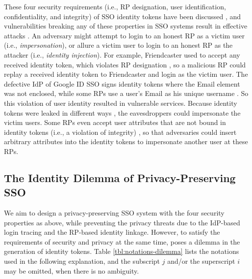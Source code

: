 These four security requirements (i.e., RP designation, user identification, confidentiality, and integrity) of SSO identity tokens
     have been discussed \cite{ArmandoCCCT08,FettKS16, FettKS17},
     and
     vulnerabilities breaking any of these properties in SSO systems
            result in effective attacks \cite{SomorovskyMSKJ12, WangCW12, ArmandoCCCPS13, ZhouE14, WangZLLYLG15, WangZLG16, YangLLZH16, MainkaMS16, MainkaMSW17, YangLCZ18, YangLS17, ShiWL19, ChenPCTKT14, ccsSunB12, DiscoveringJCS, dimvaLiM16, CaoSBKVC14, TowardsShehabM14}.
An adversary might attempt to login to an honest RP as a victim user (i.e., \emph{impersonation}),
 or allure a victim user to login to an honest RP as the attacker (i.e.,  \emph{identity injection}).
For example, Friendcaster used to accept any received identity token, which violates RP designation \cite{ChenPCTKT14},
    so a malicious RP could replay a received identity token to Friendcaster and login as the victim user.
The defective IdP of Google ID SSO signs identity tokens where the Email element was not enclosed,
        while some RPs use a user's Email as his unique username \cite{WangCW12}.
So this violation of user identity resulted in vulnerable services.
Because identity tokens were leaked in different ways \cite{WangCW12,ccsSunB12,ArmandoCCCPS13,DiscoveringJCS,dimvaLiM16},
 the eavesdroppers could impersonate the victim users.
Some RPs even accept user attributes that are not bound in identity tokens (i.e., a violation of integrity) \cite{WangCW12},
  so that adversaries could insert arbitrary attributes into the identity tokens to impersonate another user at these RPs.




\subsection{The Identity Dilemma of Privacy-Preserving SSO}
\label{subsec:challenges}
We aim to design a privacy-preserving SSO system with the four security properties as above,
    while preventing the privacy threats due to the IdP-based login tracing and the RP-based identity linkage.
However, to satisfy the requirements of security and privacy at the same time,
     poses a dilemma in the generation of identity tokens.
Table \ref{tbl:notations-dilemma} lists the notations used in the following explanation,
    and the subscript $j$ and/or the superscript $i$ may be omitted, when there is no ambiguity.

